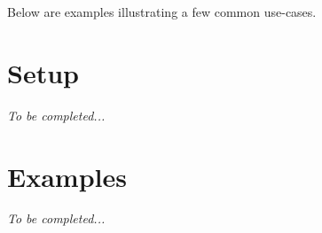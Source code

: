 Below are examples illustrating a few common use-\/cases.\hypertarget{md_docs__tutorial_Setup}{}\section{Setup}\label{md_docs__tutorial_Setup}
{\itshape To be completed...}\hypertarget{md_docs__tutorial_Examples}{}\section{Examples}\label{md_docs__tutorial_Examples}
{\itshape To be completed...} 